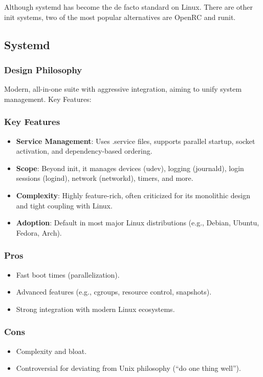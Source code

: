 Although systemd has become the de facto standard on Linux. There are other init systems, two of the most popular alternatives are OpenRC and runit.


\subsection{Systemd}
\subsubsection{Design Philosophy}
Modern, all-in-one suite with aggressive integration, aiming to unify system management.
Key Features:


\subsubsection{Key Features}
\begin{itemize}
\item \textbf{Service Management}: Uses .service files, supports parallel startup, socket activation, and dependency-based ordering.
\item \textbf{Scope}: Beyond init, it manages devices (udev), logging (journald), login sessions (logind), network (networkd), timers, and more.
\item \textbf{Complexity}: Highly feature-rich, often criticized for its monolithic design and tight coupling with Linux.
\item \textbf{Adoption}: Default in most major Linux distributions (e.g., Debian, Ubuntu, Fedora, Arch).
\end{itemize}


\subsubsection{Pros}
\begin{itemize}
\item Fast boot times (parallelization).
\item Advanced features (e.g., cgroups, resource control, snapshots).
\item Strong integration with modern Linux ecosystems.
\end{itemize}


\subsubsection{Cons}
\begin{itemize}
\item Complexity and bloat.
\item Controversial for deviating from Unix philosophy (``do one thing well'').
\end{itemize}



